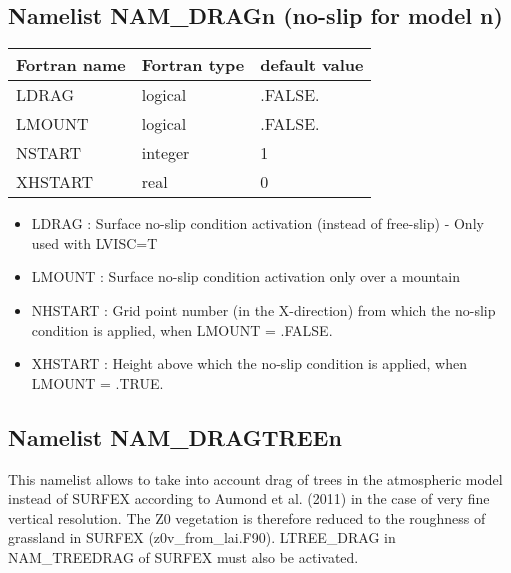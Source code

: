 \subsection{Namelist NAM\_DRAGn (no-slip for model n)}
\begin{center}
\begin{tabular}{|l|l|l| }
\hline 
 Fortran name  & Fortran type  & default value \\
\hline
 LDRAG & logical       & .FALSE.           \\
 LMOUNT & logical       & .FALSE.           \\
 NSTART & integer       & 1           \\
 XHSTART & real       & 0           \\
 \hline
\end{tabular}
\end{center}

\begin{itemize}
\item   {}
LDRAG : Surface no-slip condition activation (instead of free-slip) - Only used with LVISC=T

\item   {}
LMOUNT : Surface no-slip condition activation only over a mountain

\item   {}
NHSTART : Grid point number (in the X-direction) from which the no-slip condition is applied, when LMOUNT = .FALSE.

\item   {}
XHSTART : Height above  which the no-slip condition is applied, when LMOUNT = .TRUE. 

\end{itemize}

\subsection{Namelist NAM\_DRAGTREEn}
This namelist allows to take into account drag of trees in the atmospheric model instead of SURFEX according
to Aumond et al. (2011) in the case of very fine vertical resolution. 
The Z0 vegetation is therefore reduced to the roughness of grassland in SURFEX
 (z0v\_from\_lai.F90). LTREE\_DRAG in NAM\_TREEDRAG of SURFEX must also be activated.

